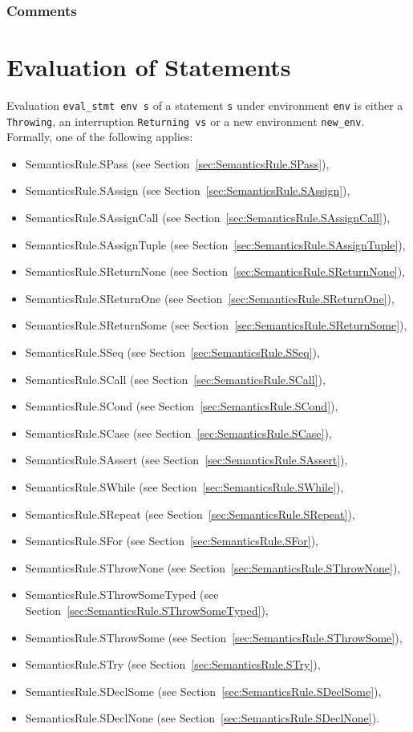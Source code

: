 \documentclass{book}
\begin{document}
    \subsection{Comments}

\chapter{Evaluation of Statements \label{chap:eval_stmt}}
Evaluation \texttt{eval\_stmt env s} of a statement \texttt{s} under
environment \texttt{env} is either a \texttt{Throwing}, an interruption
\texttt{Returning vs} or a new environment \texttt{new\_env}. Formally, one of
the following applies:
\begin{itemize}
\item SemanticsRule.SPass (see Section~\ref{sec:SemanticsRule.SPass}), 
\item SemanticsRule.SAssign (see Section~\ref{sec:SemanticsRule.SAssign}), 
\item SemanticsRule.SAssignCall (see Section~\ref{sec:SemanticsRule.SAssignCall}), 
\item SemanticsRule.SAssignTuple (see Section~\ref{sec:SemanticsRule.SAssignTuple}), 
\item SemanticsRule.SReturnNone (see Section~\ref{sec:SemanticsRule.SReturnNone}), 
\item SemanticsRule.SReturnOne (see Section~\ref{sec:SemanticsRule.SReturnOne}), 
\item SemanticsRule.SReturnSome (see Section~\ref{sec:SemanticsRule.SReturnSome}), 
\item SemanticsRule.SSeq (see Section~\ref{sec:SemanticsRule.SSeq}), 
\item SemanticsRule.SCall (see Section~\ref{sec:SemanticsRule.SCall}), 
\item SemanticsRule.SCond (see Section~\ref{sec:SemanticsRule.SCond}), 
\item SemanticsRule.SCase (see Section~\ref{sec:SemanticsRule.SCase}), 
\item SemanticsRule.SAssert (see Section~\ref{sec:SemanticsRule.SAssert}), 
\item SemanticsRule.SWhile (see Section~\ref{sec:SemanticsRule.SWhile}), 
\item SemanticsRule.SRepeat (see Section~\ref{sec:SemanticsRule.SRepeat}), 
\item SemanticsRule.SFor (see Section~\ref{sec:SemanticsRule.SFor}), 
\item SemanticsRule.SThrowNone (see Section~\ref{sec:SemanticsRule.SThrowNone}), 
\item SemanticsRule.SThrowSomeTyped (see Section~\ref{sec:SemanticsRule.SThrowSomeTyped}), 
\item SemanticsRule.SThrowSome (see Section~\ref{sec:SemanticsRule.SThrowSome}), 
\item SemanticsRule.STry (see Section~\ref{sec:SemanticsRule.STry}), 
\item SemanticsRule.SDeclSome (see Section~\ref{sec:SemanticsRule.SDeclSome}), 
\item SemanticsRule.SDeclNone (see Section~\ref{sec:SemanticsRule.SDeclNone}). 
\end{itemize}
\end{document}
